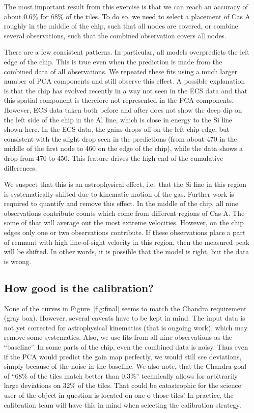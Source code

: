 \documentclass[]{spie}  %
\begin{document}
The most important result from this exercise is that we can reach an accuracy of about 0.6\% for 68\% of the tiles. To do so, we need to select a placement of Cas A roughly in the middle of the chip, such that all nodes are covered, or combine several observations, such that the combined observation covers all nodes.

There are a few consistent patterns. In particular, all models overpredicts the left edge of the chip. This is true even when the prediction is made from the combined data of all observations. We repeated these fits using a much larger number of PCA components and still observe this effect. A possible explanation is that the chip has evolved recently in a way not seen in the ECS data and that this spatial component is therefore not represented in the PCA components. However, ECS data taken both before and after does not show the deep dip on the left side of the chip in the Al line, which is close in energy to the Si line shown here. In the ECS data, the gains drops off on the left chip edge, but consistent with the slight drop seen in the predictions (from about 470 in the middle of the first node to 460 on the edge of the chip), while the data shows a drop from 470 to 450. This feature drives the high end of the cumulative differences.

We suspect that this is an astrophysical effect, i.e.\ that the Si line in this region is systematically shifted due to kinematic motion of the gas. Further work is required to quantify and remove this effect. In the middle of the chip, all nine observations contribute counts which come from different regions of Cas A. The some of that will average out the most extreme velocities. However, on the chip edges only one or two observations contribute. If these observations place a part of remnant with high line-of-sight velocity in this region, then the measured peak will be shifted. In other words, it is possible that the model is right, but the data is wrong.

\subsection{How good is the calibration?}
None of the curves in Figure~\ref{fig:final} seems to match the Chandra requirement (gray box). However, several caveats have to be kept in mind: The input data is not yet corrected for astrophysical kinematics (that is ongoing work), which may remove some systematics. Also, we use fits from all nine observations as the ``baseline''. In some parts of the chip, even the combined data is noisy. Thus even if the PCA would predict the gain map perfectly, we would still see deviations, simply because of the noise in the baseline. We also note, that the Chandra goal of ``68\% of the tiles match better than 0.3\%'' technically allows for arbitrarily large deviations on 32\% of the tiles. That could be catastrophic for the science user of the object in question is located on one o those tiles! In practice, the calibration team will have this in mind when selecting the calibration strategy.
\end{document}
